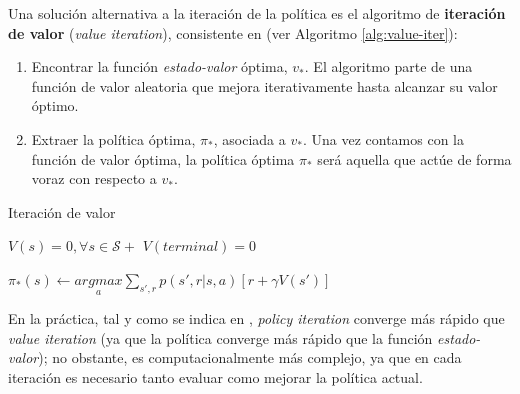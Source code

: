 Una solución alternativa a la iteración de la política es el algoritmo de \textbf{iteración de valor} (\textit{value iteration}), consistente en (ver Algoritmo \ref{alg:value-iter}):

\begin{enumerate}
    \item Encontrar la función \textit{estado-valor} óptima, $v_*$. El algoritmo parte de una función de valor aleatoria que mejora iterativamente hasta alcanzar su valor óptimo.
    \item Extraer la política óptima, $\pi_*$, asociada a $v_*$. Una vez contamos con la función de valor óptima, la política óptima $\pi_*$ será aquella que actúe de forma voraz con respecto a $v_*$.
\end{enumerate}

\begin{algorithm}
\caption{Iteración de valor}
\label{alg:value-iter}
\DontPrintSemicolon
\LinesNumbered
{}

    $V(s) = 0, \forall s \in \mathcal{S}+$\;
    $V(terminal) = 0$\;
    
    
    $\pi_*(s) \leftarrow \underset{a}{argmax} \sum_{s',r}p(s', r | s, a)[r + \gamma V(s')]$\;
    

\end{algorithm}

En la práctica, tal y como se indica en \cite{sutton2018reinforcement}, \textit{policy iteration} converge más rápido que \textit{value iteration} (ya que la política converge más rápido que la función \textit{estado-valor}); no obstante, es computacionalmente más complejo, ya que en cada iteración es necesario tanto evaluar como mejorar la política actual.

